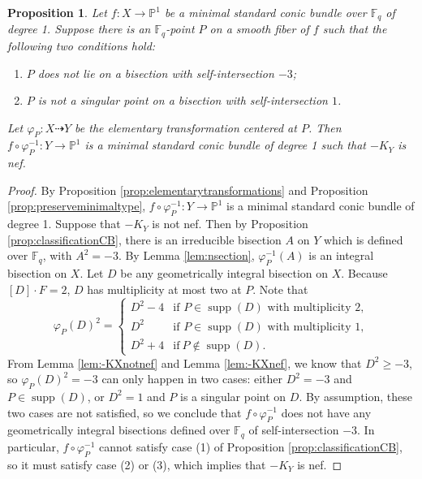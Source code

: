 \documentclass[a4paper, 11pt, reqno]{amsart}
\numberwithin{equation}{section} \numberwithin{figure}{section}
\DeclareMathOperator{\supp}{supp}
\def \F {{\mathbb F}}
\def \P {{\mathbb P}}
\newcommand{\ra}{\rightarrow}
\newtheorem{proposition}[lemma]{Proposition}
\theoremstyle{definition}
\numberwithin{lemma}{section}
\begin{document}
\begin{proposition}\label{prop:(1)}
    Let $f \colon X \ra \P^1$ be a minimal standard conic bundle over $\F_q$ of degree 1. Suppose there is an $\F_q$-point $P$ on a smooth fiber of $f$ such that the following two conditions hold:
    \begin{enumerate}[label=(\alph*)]
         \item $P$ does not lie on a bisection with self-intersection $-3$;
        \item $P$ is not a singular point on a bisection with self-intersection $1$.
    \end{enumerate}
     Let $\varphi_{\scriptscriptstyle P} \colon X \dashrightarrow Y$ be the elementary transformation centered at $P$. Then $f \circ \varphi_{\scriptscriptstyle P}^{-1} \colon Y \ra \P^1$ is a minimal standard conic bundle of degree 1 such that $-K_Y$ is nef.
\end{proposition}

\begin{proof}
    By Proposition \ref{prop:elementarytransformations} and Proposition \ref{prop:preserveminimaltype}, $f \circ \varphi_{\scriptscriptstyle P}^{-1} \colon Y \ra \P^1$ is a minimal standard conic bundle of degree 1. Suppose that $-K_Y$ is not nef. Then by Proposition \ref{prop:classificationCB}, there is an irreducible bisection $A$ on $Y$ which is defined over $\F_q$, with $A^2 = -3$. By Lemma \ref{lem:nsection}, $\varphi_{\scriptscriptstyle P}^{-1}(A)$ is an integral bisection on $X$. Let $D$ be any geometrically integral bisection on $X$. Because $[D] \cdot F = 2$, $D$ has multiplicity at most two at $P$. Note that \[\varphi_{\scriptscriptstyle P}(D)^2 = \begin{cases}
        D^2 - 4 &\text{if $P \in \supp(D)$ with multiplicity 2},\\
        D^2 &\text{if $P \in \supp(D)$ with multiplicity 1},\\
        D^2 + 4 &\text{if} \ P \notin \supp(D).
    \end{cases}\]
    From Lemma \ref{lem:-KXnotnef} and Lemma \ref{lem:-KXnef}, we know that $D^2 \geq -3$, so $\varphi_{\scriptscriptstyle P}(D)^2 = -3$ can only happen in two cases: either $D^2 = -3$ and $P \in \supp(D)$, or $D^2 = 1$ and $P$ is a singular point on $D$. By assumption, these two cases are not satisfied, so we conclude that $f \circ \varphi_{\scriptscriptstyle P}^{-1}$ does not have any geometrically integral bisections defined over $\F_q$ of self-intersection $-3$. In particular, $f \circ \varphi_{\scriptscriptstyle P}^{-1}$ cannot satisfy case (1) of Proposition \ref{prop:classificationCB}, so it must satisfy case (2) or (3), which implies that $-K_Y$ is nef.
\end{proof} 
\end{document}
